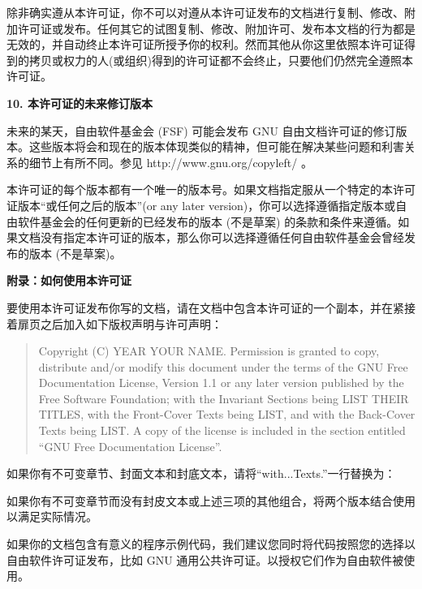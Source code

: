 除非确实遵从本许可证，你不可以对遵从本许可证发布的文档进行复制、修改、附加许可证或发布。任何其它的试图复制、修改、附加许可、发布本文档的行为都是无效的，并自动终止本许可证所授予你的权利。然而其他从你这里依照本许可证得到的拷贝或权力的人(或组织)得到的许可证都不会终止，只要他们仍然完全遵照本许可证。

\begin{center}
{\Large\bf 10. 本许可证的未来修订版本\par}
\end{center}


未来的某天，自由软件基金会 (FSF) 可能会发布 GNU 自由文档许可证的修订版本。这些版本将会和现在的版本体现类似的精神，但可能在解决某些问题和利害关系的细节上有所不同。参见 http://www.gnu.org/copyleft/ 。

本许可证的每个版本都有一个唯一的版本号。如果文档指定服从一个特定的本许可证版本``或任何之后的版本''(or any later version)，你可以选择遵循指定版本或自由软件基金会的任何更新的已经发布的版本 (不是草案) 的条款和条件来遵循。如果文档没有指定本许可证的版本，那么你可以选择遵循任何自由软件基金会曾经发布的版本 (不是草案)。

\begin{center}
{\Large\bf 附录：如何使用本许可证\par}
\end{center}


要使用本许可证发布你写的文档，请在文档中包含本许可证的一个副本，并在紧接着扉页之后加入如下版权声明与许可声明：

\begin{quote}

Copyright (C) YEAR YOUR NAME.
Permission is granted to copy, distribute and/or modify this document under the terms of the GNU Free Documentation License, Version 1.1 or any later version published by the Free Software Foundation; with the Invariant Sections being LIST THEIR TITLES, with the Front-Cover Texts being LIST, and with the Back-Cover Texts being LIST. A copy of the license is included in the section entitled ``GNU Free Documentation License''.

\end{quote}

如果你有不可变章节、封面文本和封底文本，请将``with...Texts.''一行替换为：

如果你有不可变章节而没有封皮文本或上述三项的其他组合，将两个版本结合使用以满足实际情况。

如果你的文档包含有意义的程序示例代码，我们建议您同时将代码按照您的选择以自由软件许可证发布，比如 GNU 通用公共许可证。以授权它们作为自由软件被使用。
\fi
